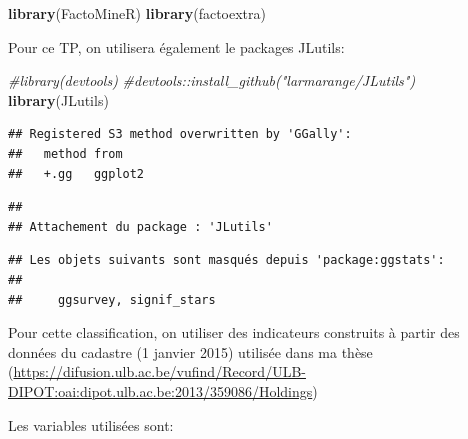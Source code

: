 \documentclass[
]{book}
\newenvironment{Shaded}{\begin{snugshade}}{\end{snugshade}}
\newcommand{\CommentTok}[1]{\textcolor[rgb]{0.56,0.35,0.01}{\textit{#1}}}
\newcommand{\FunctionTok}[1]{\textcolor[rgb]{0.13,0.29,0.53}{\textbf{#1}}}
\newcommand{\NormalTok}[1]{#1}
\begin{document}
\begin{Shaded}
\begin{Highlighting}[]
\FunctionTok{library}\NormalTok{(FactoMineR)}
\FunctionTok{library}\NormalTok{(factoextra)}
\end{Highlighting}
\end{Shaded}

Pour ce TP, on utilisera également le packages JLutils:

\begin{Shaded}
\begin{Highlighting}[]
\CommentTok{\#library(devtools)}
\CommentTok{\#devtools::install\_github("larmarange/JLutils")}
\FunctionTok{library}\NormalTok{(JLutils)}
\end{Highlighting}
\end{Shaded}

\begin{verbatim}
## Registered S3 method overwritten by 'GGally':
##   method from   
##   +.gg   ggplot2
\end{verbatim}

\begin{verbatim}
## 
## Attachement du package : 'JLutils'
\end{verbatim}

\begin{verbatim}
## Les objets suivants sont masqués depuis 'package:ggstats':
## 
##     ggsurvey, signif_stars
\end{verbatim}

Pour cette classification, on utiliser des indicateurs construits à partir des données du cadastre (1 janvier 2015) utilisée dans ma thèse (\url{https://difusion.ulb.ac.be/vufind/Record/ULB-DIPOT:oai:dipot.ulb.ac.be:2013/359086/Holdings})

Les variables utilisées sont:
\end{document}
